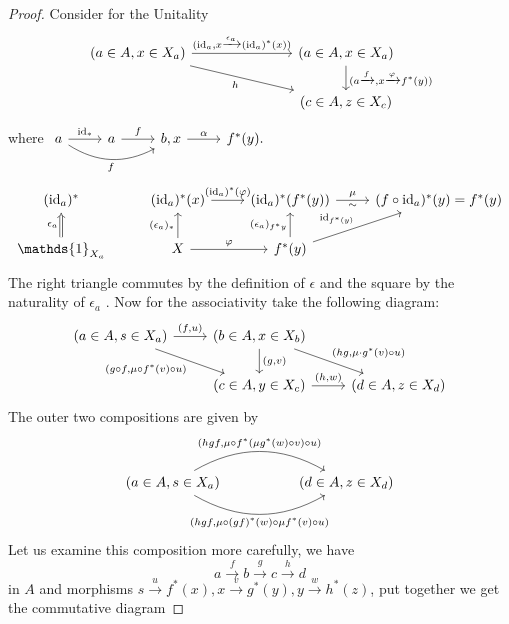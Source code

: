 \begin{proof}
	Consider for the Unitality
	\[
	\begin{tikzcd}
		( a \in A , x \in X_a )
		\ar[rrr, " { ( \id_a , x \xrightarrow{ \epsilon_a } ( \id_a )^* ( x ) ) } " ]
		\ar[rrrd, " h "' ]
		&&&
		( a \in A , x \in X_a )
		\ar[d, " { ( a \xrightarrow{ f } , x \xrightarrow{ \varphi } f^* ( y ) ) } " ]
		\\
		&&&
		( c \in A , z \in X_c )
	\end{tikzcd}
	\]
	where
	$
	\begin{tikzcd}		
		a
		\ar[r, " \id_* "]
		\ar[rr, bend right, " f "' ]
		&
		a
		\ar[r, " f " ]
		&
		b , x
		\ar[r, " \alpha " ]
		&
		f^* ( y ).
	\end{tikzcd} 
	$
	\[
	\begin{tikzcd}
		( \id_a )^*
		&
		( \id_a )^* ( x )
		\ar[r , " ( \id_a )^* ( \varphi ) "]
		&
		( \id_a )^* ( f^* ( y ) )
		\ar[r, "\mu" , "\sim"']
		&
		( f \circ \id_a )^* ( y ) = f^* ( y )
		\\
		\mathds{ 1 }_{ X_a }
		\ar[ u , Rightarrow, " \epsilon_a " ]
		&
		X
		\ar[u, " ( \epsilon_a )_* "]
		\ar[r, " \varphi " ]
		&
		f^* ( y ) 
		\ar[u, "{ ( \epsilon_a )_{ f^* y } }" ]
		\ar[ru, " \id_{ f^* ( y ) } " ]
	\end{tikzcd}
	\]
	The right triangle commutes by the definition of $ \epsilon $ and the square by the naturality of $ \epsilon_a $ .
	Now for the associativity take the following diagram:
	\[
	\begin{tikzcd}	
		( a \in A , s \in X_a ) 
		\ar[r, " { ( f , u ) } " ]
		\ar[rd, " { ( g \circ f , \mu \circ f^* ( v ) \circ u ) } "' ]
		&
		( b \in A , x \in X_b )
		\ar[d, " {  ( g , v ) } "]
		\ar[rd, " { (  h g , \mu \cdot g^* ( v ) \circ u ) } " ]
		\\
		&
		( c \in A , y \in X_c )
		\ar[r , " { ( h , w ) } "]
		&
		( d \in A , z \in X_d )
	\end{tikzcd}
	\]
	The outer two compositions are given by
	\[
	\begin{tikzcd}		
		( a \in A , s \in X_a )
		\ar[rr, bend left, "{ ( hgf , \mu \circ f^* ( \mu g^* ( w ) \circ v ) \circ u )}"]
		\ar[rr, bend right, "{ ( hgf, \mu \circ ( gf )^* ( w ) \circ \mu f^* ( v ) \circ u ) } "']
		&&
		( d \in A , z \in X_d )
	\end{tikzcd}
	\]
	Let us examine this composition more carefully, we have
	\[
		a \xrightarrow{f} b \xrightarrow{g} c \xrightarrow{h} d
	\]
	in $ A $
	and morphisms $ s \xrightarrow{u} f^* ( x ) , x \xrightarrow{v} g^* ( y ) , y \xrightarrow{w} h^* ( z ) $, put together we get the commutative diagram

\end{proof}
